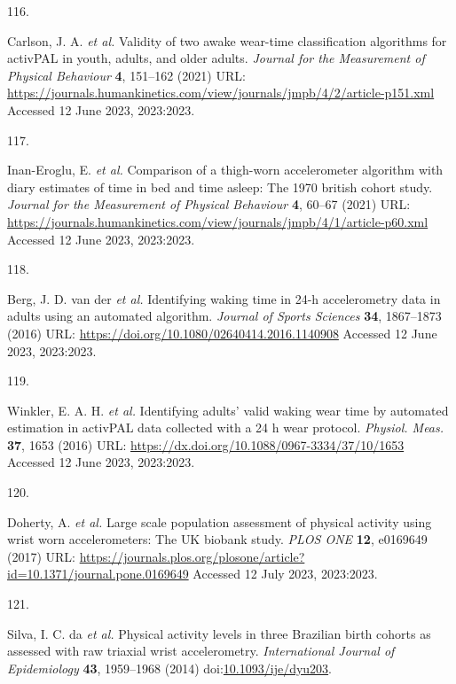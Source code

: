 \documentclass[
  10pt,
]{scrbook}
\newlength{\cslhangindent}
\newlength{\csllabelwidth}
\newlength{\cslentryspacingunit} %
\newenvironment{CSLReferences}[2] %
 {%
  \setlength{\parindent}{0pt}
  \ifodd #1
  \let\oldpar\par
  \def\par{\hangindent=\cslhangindent\oldpar}
  \fi
  \setlength{\parskip}{#2\cslentryspacingunit}
 }%
 {}
\newcommand{\CSLLeftMargin}[1]{\parbox[t]{\csllabelwidth}{#1}}
\newcommand{\CSLRightInline}[1]{\parbox[t]{\linewidth - \csllabelwidth}{#1}\break}
\begin{document}
\begin{CSLReferences}{0}{0}
\leavevmode{}%
\CSLLeftMargin{116. }%
\CSLRightInline{Carlson, J. A. \emph{et al.} Validity of two awake
wear-time classification algorithms for {activPAL} in youth, adults, and
older adults. \emph{Journal for the Measurement of Physical Behaviour}
\textbf{4}, 151--162 (2021) URL:
\url{https://journals.humankinetics.com/view/journals/jmpb/4/2/article-p151.xml}
Accessed 12 June 2023, 2023:2023.}

\leavevmode{}%
\CSLLeftMargin{117. }%
\CSLRightInline{Inan-Eroglu, E. \emph{et al.} Comparison of a thigh-worn
accelerometer algorithm with diary estimates of time in bed and time
asleep: The 1970 british cohort study. \emph{Journal for the Measurement
of Physical Behaviour} \textbf{4}, 60--67 (2021) URL:
\url{https://journals.humankinetics.com/view/journals/jmpb/4/1/article-p60.xml}
Accessed 12 June 2023, 2023:2023.}

\leavevmode{}%
\CSLLeftMargin{118. }%
\CSLRightInline{Berg, J. D. van der \emph{et al.} Identifying waking
time in 24-h accelerometry data in adults using an automated algorithm.
\emph{Journal of Sports Sciences} \textbf{34}, 1867--1873 (2016) URL:
\url{https://doi.org/10.1080/02640414.2016.1140908} Accessed 12 June
2023, 2023:2023.}

\leavevmode{}%
\CSLLeftMargin{119. }%
\CSLRightInline{Winkler, E. A. H. \emph{et al.} Identifying adults'
valid waking wear time by automated estimation in {activPAL} data
collected with a 24 h wear protocol. \emph{Physiol. Meas.} \textbf{37},
1653 (2016) URL: \url{https://dx.doi.org/10.1088/0967-3334/37/10/1653}
Accessed 12 June 2023, 2023:2023.}

\leavevmode{}%
\CSLLeftMargin{120. }%
\CSLRightInline{Doherty, A. \emph{et al.} Large scale population
assessment of physical activity using wrist worn accelerometers: The
{UK} biobank study. \emph{{PLOS} {ONE}} \textbf{12}, e0169649 (2017)
URL:
\url{https://journals.plos.org/plosone/article?id=10.1371/journal.pone.0169649}
Accessed 12 July 2023, 2023:2023.}

\leavevmode{}%
\CSLLeftMargin{121. }%
\CSLRightInline{Silva, I. C. da \emph{et al.} Physical activity levels
in three Brazilian birth cohorts as assessed with raw triaxial wrist
accelerometry. \emph{International Journal of Epidemiology} \textbf{43},
1959--1968 (2014)
doi:\href{https://doi.org/10.1093/ije/dyu203}{10.1093/ije/dyu203}.}


\end{CSLReferences}
\end{document}
